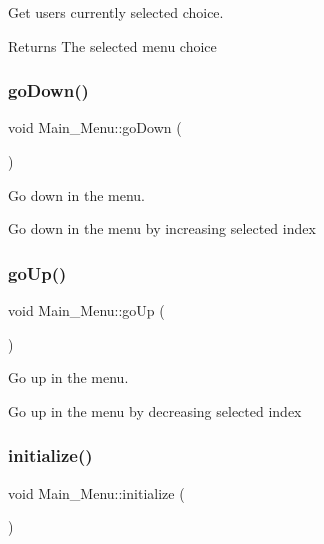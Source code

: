 Get user\textquotesingle{}s currently selected choice. 

\begin{DoxyReturn}{Returns}
The selected menu choice 
\end{DoxyReturn}
\mbox{\label{classMain__Menu_a0f95b5c387bd1cc18ba236a99060737c}} 
\subsubsection{\texorpdfstring{go\+Down()}{goDown()}}
{\footnotesize\ttfamily void Main\+\_\+\+Menu\+::go\+Down (\begin{DoxyParamCaption}{ }\end{DoxyParamCaption})}



Go down in the menu. 

Go down in the menu by increasing selected index \mbox{\label{classMain__Menu_abd0bafbcc3a3aac9811cc6fde075b29c}} 
\subsubsection{\texorpdfstring{go\+Up()}{goUp()}}
{\footnotesize\ttfamily void Main\+\_\+\+Menu\+::go\+Up (\begin{DoxyParamCaption}{ }\end{DoxyParamCaption})}



Go up in the menu. 

Go up in the menu by decreasing selected index \mbox{\label{classMain__Menu_a453355fbb089549540a20eb7e540f04e}} 
\subsubsection{\texorpdfstring{initialize()}{initialize()}}
{\footnotesize\ttfamily void Main\+\_\+\+Menu\+::initialize (\begin{DoxyParamCaption}{ }\end{DoxyParamCaption})}



